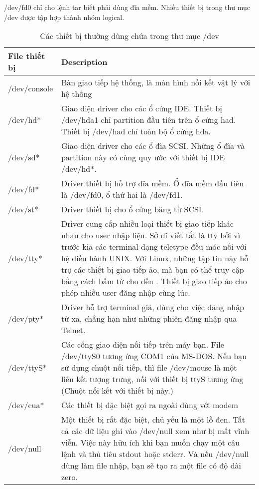 \documentclass[twoside]{article}
\begin{document}
/dev/fd0 chỉ cho lệnh tar biết phải dùng đĩa mềm. Nhiều thiết bị trong thư mục /dev được tập hợp thành nhóm logical. \\
\begin{savenotes}
    \begin{table}[ht]
    	\centering
        \begin{tabular}{|m{5em}|m{35em}|} 
            \hline
            File thiết bị & Description\\
            \hline
            /dev/console & Bàn giao tiếp hệ thống, là màn hình nối kết vật lý với hệ thống\\
            \hline
            /dev/hd* & Giao diện driver cho các ổ cứng IDE. Thiết bị /dev/hda1 chỉ partition đầu tiên trên ổ cứng had. Thiết bị /dev/had chỉ toàn bộ ổ cứng hda.\\
            \hline
            /dev/sd* & Giao diện driver cho các ổ đĩa SCSI. Những ổ đĩa và partition này có cùng quy ước với thiết bị IDE /dev/hd*. \\
            \hline
            /dev/fd* & Driver thiết bị hỗ trợ đĩa mềm. Ổ đĩa mềm đầu tiên là /dev/fd0, ổ thứ hai là /dev/fd1. \\
            \hline
            /dev/st* & Driver thiết bị cho ổ cứng băng từ SCSI.\\
            \hline
            /dev/tty* & Driver cung cấp nhiều loại thiết bị giao tiếp khác nhau cho user nhập liệu. Sở dĩ viết tắt là tty bởi vì trước kia các terminal dạng teletype đều móc nối với hệ điều hành UNIX. Với Linux, những tập tin này hỗ trợ các thiết bị giao tiếp ảo, mà bạn có thể truy cập bằng cách bấm từ cho đến . Thiết bị giao tiếp ảo cho phép nhiều user đăng nhập cùng lúc.\\
            \hline 
            /dev/pty* & Driver hỗ trợ terminal giả, dùng cho việc đăng nhập từ xa, chẳng hạn như những phiên đăng nhập qua Telnet.\\
			\hline            
            /dev/ttyS* & Các cổng giao diện nối tiếp trên máy bạn. File /dev/ttyS0 tương ứng COM1 của MS-DOS. Nếu bạn sử dụng chuột nối tiếp, thì file /dev/mouse là một liên kết tượng trưng, nối với thiết bị ttyS tương ứng (Chuột nối kết với thiết bị này.) \\
            \hline
            /dev/cua* & Các thiết bị đặc biệt gọi ra ngoài dùng với modem\\
            \hline
            /dev/null & Một thiết bị rất đặc biệt, chủ yếu là một lỗ đen. Tất cả các dữ liệu ghi vào /dev/null xem như bị mất vĩnh viễn. Việc này hữu ích khi bạn muốn chạy một câu lệnh và thủ tiêu stdout hoặc stderr. Và nếu /dev/null dùng làm file nhập, bạn sẽ tạo ra một file có độ dài zero.\\
            \hline
        \end{tabular}
        \caption{Các thiết bị thường dùng chứa trong thư mục /dev}
    \end{table}%
\end{savenotes}
\end{document}
